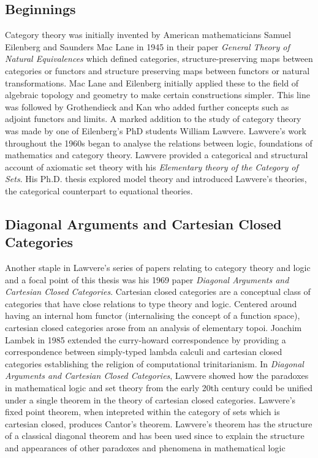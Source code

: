 \subsection{Beginnings}
Category theory was initially invented by American mathematicians Samuel
Eilenberg and Saunders Mac Lane in 1945 in their paper \textit{General Theory of
Natural Equivalences} which defined categories, structure-preserving maps
between categories or functors and structure preserving maps between functors or
natural transformations. Mac Lane and Eilenberg initially applied these to the
field of algebraic topology and geometry to make certain constructions simpler.
This line was followed by Grothendieck and Kan who added further concepts such
as adjoint functors and limits. A marked addition to the study of category
theory was made by one of Eilenberg's PhD students William Lawvere. Lawvere's
work throughout the 1960s began to analyse the relations between logic,
foundations of mathematics and category theory. Lawvere provided a categorical
and structural account of axiomatic set theory with his \textit{Elementary theory of the
Category of Sets}. His Ph.D. thesis explored model theory and introduced
Lawvere's theories, the categorical counterpart to equational theories.

\subsection{Diagonal Arguments and Cartesian Closed Categories}
Another staple in Lawvere's series of papers relating to category theory and
logic and a focal point of this thesis was his 1969 paper \textit{Diagonal
Arguments and Cartesian Closed Categories}. Cartesian closed categories are
a conceptual class of categories that have close relations to type theory and
logic. Centered around having an internal hom functor (internalising the concept
of a function space), cartesian closed categories arose from an analysis of
elementary topoi. Joachim Lambek in 1985 extended the curry-howard
correspondence by providing a correspondence between simply-typed lambda calculi
and cartesian closed categories establishing the religion of computational
trinitarianism. In \textit{Diagonal Arguments and Cartesian Closed Categories},
Lawvere showed how the paradoxes in mathematical logic and set theory from the
early 20th century could be unified under a single theorem in the theory of
cartesian closed categories. Lawvere's fixed point theorem, when intepreted
within the category of sets which is cartesian closed, produces Cantor's
theorem. Lawvere's theorem has the structure of a classical diagonal theorem and
has been used since to explain the structure and appearances of other paradoxes
and phenomena in mathematical logic

